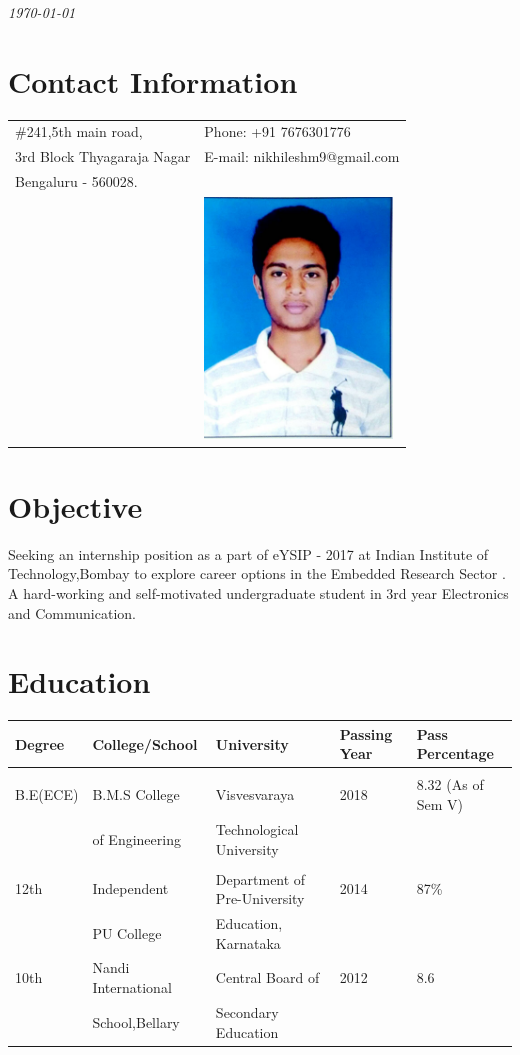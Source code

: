 \documentclass[margin,line]{res}
\begin{document}
 \hfill {\em \today}

\begin{resume}
\section{\sc Contact Information}

\vspace{.05in}
\begin{tabular}{@{}p{3.5in}p{3in}}
\#241,5th main road,             & {Phone:}  +91 7676301776 \\
3rd Block Thyagaraja Nagar 
 & {E-mail:}  nikhileshm9@gmail.com\\
Bengaluru - 560028.\\
 & \includegraphics[width=5cm]{PassportPhoto}
\end{tabular}
\section{\sc Objective}

Seeking an internship position as a part of eYSIP - 2017 at Indian Institute of Technology,Bombay to explore career options in the Embedded Research Sector . A hard-working and self-motivated undergraduate student in 3rd year Electronics and Communication.

\section{\sc Education}
\begin{tabular}{ L{1in} L{1in} L{1in} L{0.5in} L{1in} }
	\textbf{Degree} & \textbf{College/School} & \textbf{University} & \textbf{Passing Year} & \textbf{Pass Percentage} \\ 
	\hline \\
	B.E(ECE) & B.M.S College & Visvesvaraya  & 2018 & 8.32 (As of Sem V) \\ &  of Engineering & Technological University & & \\ \\
	12th & Independent & Department of Pre-University & 2014 & 87\% \\ & PU College & Education, Karnataka & & \\
	10th & Nandi International& Central Board of & 2012 & 8.6 \\ &  School,Bellary & Secondary Education & & \\
	\hline	
\end{tabular}


\end{resume}
\end{document}
